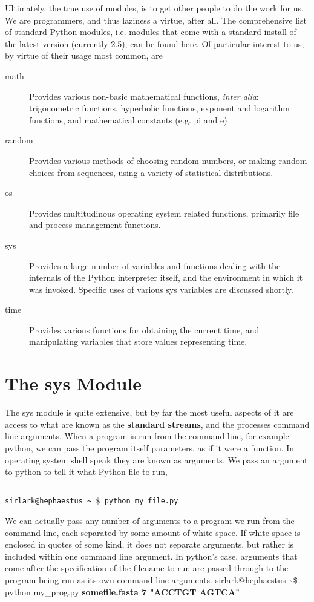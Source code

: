 Ultimately, the true use of modules, is to get other people to do   the work for us. We are programmers, and thus laziness a virtue, after   all. The comprehensive list of standard Python modules, i.e. modules   that come with a standard install of the latest version (currently   2.5), can be found \href{http://docs.python.org/modindex.html}{here}. Of particular   interest to us, by virtue of their usage most common, are
\begin{description}
	\item[math] Provides various non-basic mathematical functions, \textit{inter    alia}: trigonometric functions, hyperbolic functions, exponent    and logarithm functions, and mathematical constants (e.g. pi and    e)
	\item[random] Provides various methods of choosing random numbers, or making    random choices from sequences, using a variety of statistical    distributions.
	\item[os] Provides multitudinous operating system related functions,    primarily file and process management functions.
	\item[sys] Provides a large number of variables and functions dealing with    the internals of the Python interpreter itself, and the environment    in which it was invoked. Specific uses of various sys variables are    discussed shortly.
	\item[time] Provides various functions for obtaining the current time, and    manipulating variables that store values representing time.
\end{description}

\section{The sys Module}

The sys module is quite extensive, but by far the most useful   aspects of it are access to what are known as the \textbf{standard   streams}, and the processes command line arguments. When a   program is run from the command line, for example python, we can pass   the program itself parameters, as if it were a function. In operating   system shell speak they are known as arguments. We pass an argument to   python to tell it what Python file to run,
\begin{lstlisting}

sirlark@hephaestus ~ $ python my_file.py
\end{lstlisting}

We can actually pass any number of arguments to a program we run   from the command line, each separated by some amount of white space. If   white space is enclosed in quotes of some kind, it does not separate   arguments, but rather is included within one command line argument. In   python's case, arguments that come after the specification of the   filename to run are passed through to the program being run as its own   command line arguments.    sirlark@hephaestus \textasciitilde \$ python my\_prog.py \textbf{somefile.fasta 7 "ACCTGT AGTCA"}

